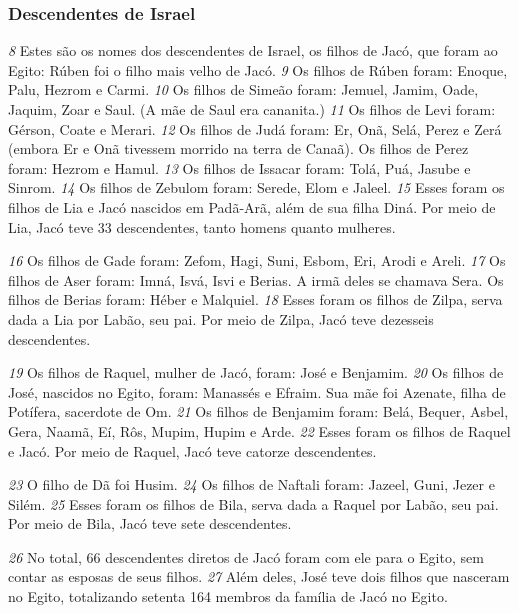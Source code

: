 \subsubsection*{Descendentes de Israel}
\textit{\tiny 8} 
Estes são os nomes dos descendentes de Israel, os filhos de Jacó, que foram ao
Egito:
Rúben foi o filho mais velho de Jacó. 
\textit{\tiny 9} 
Os filhos de Rúben foram: Enoque, Palu,
 Hezrom e Carmi.
\textit{\tiny 10}
Os filhos de Simeão foram: Jemuel, Jamim, Oade, Jaquim, Zoar e Saul. (A mãe de
 Saul era cananita.)
\textit{\tiny 11}
Os filhos de Levi foram: Gérson, Coate e Merari.
\textit{\tiny 12}
Os filhos de Judá foram: Er, Onã, Selá, Perez e Zerá (embora Er e Onã tivessem
 morrido na terra de Canaã). Os filhos de Perez foram: Hezrom e Hamul.
\textit{\tiny 13}
Os filhos de Issacar foram: Tolá, Puá,
Jasube
e Sinrom.
\textit{\tiny 14}
Os filhos de Zebulom foram: Serede, Elom e Jaleel.
\textit{\tiny 15}
Esses foram os filhos de Lia e Jacó nascidos em Padã-Arã, além de sua filha
Diná. Por meio de Lia, Jacó teve 33
 descendentes, tanto homens quanto mulheres.

\bigskip
\textit{\tiny 16}
Os filhos de Gade foram: Zefom, Hagi, Suni, Esbom, Eri, Arodi e Areli.
\textit{\tiny 17}
Os filhos de Aser foram:  Imná, Isvá, Isvi e Berias. A irmã deles se chamava Sera.
 Os filhos de Berias foram: Héber e Malquiel.
\textit{\tiny 18}
Esses foram os filhos de Zilpa, serva dada a Lia por Labão, seu pai. Por meio de
Zilpa, Jacó teve dezesseis descendentes.

\bigskip
\textit{\tiny 19}
Os filhos de Raquel, mulher de Jacó, foram: José e Benjamim.
\textit{\tiny 20}
Os filhos de José, nascidos no Egito, foram: Manassés e Efraim. Sua mãe foi
 Azenate, filha de Potífera, sacerdote de Om.
\textit{\tiny 21}
Os filhos de Benjamim foram: Belá, Bequer, Asbel, Gera, Naamã, Eí, Rôs, Mupim,
 Hupim e Arde.
\textit{\tiny 22}
Esses foram os filhos de Raquel e Jacó. Por meio de Raquel, Jacó teve catorze
descendentes.

\bigskip
\textit{\tiny 23}
O filho de Dã foi Husim.
\textit{\tiny 24}
Os filhos de Naftali foram: Jazeel, Guni, Jezer e Silém.
\textit{\tiny 25}
Esses   foram os filhos de Bila, serva dada a Raquel por Labão, seu pai. Por meio
de Bila, Jacó teve sete descendentes.

\bigskip
\textit{\tiny 26}
No total, 66 descendentes diretos de Jacó foram com ele para o Egito, sem
contar as esposas de seus filhos. 
\textit{\tiny 27}
Além deles, José teve dois filhos
que
nasceram no Egito, totalizando setenta 164 membros da família de Jacó no Egito.

